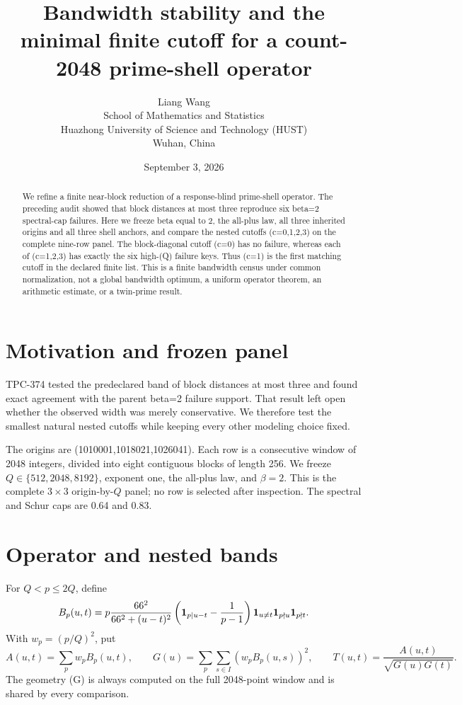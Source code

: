 \documentclass[10pt]{article}
\title{Bandwidth stability and the minimal finite cutoff for a\newline
count-2048 prime-shell operator}
\author{Liang Wang\\
School of Mathematics and Statistics\\
Huazhong University of Science and Technology (HUST)\\
Wuhan, China}
\date{September 3, 2026}
\begin{document}
\maketitle

\begin{abstract}
We refine a finite near-block reduction of a response-blind prime-shell
operator.  The preceding audit showed that block distances at most three
reproduce six beta=2 spectral-cap failures.  Here we freeze beta equal to 2,
the all-plus law, all three inherited origins and all three shell anchors, and
compare the nested cutoffs (c=0,1,2,3) on the complete nine-row panel.  The
block-diagonal cutoff (c=0) has no failure, whereas each of (c=1,2,3)
has exactly the six high-(Q) failure keys.  Thus (c=1) is the first
matching cutoff in the declared finite list.  This is a finite bandwidth
census under common normalization, not a global bandwidth optimum, a
uniform operator theorem, an arithmetic estimate, or a twin-prime result.
\end{abstract}

\section{Motivation and frozen panel}

TPC-374 tested the predeclared band of block distances at most three and
found exact agreement with the parent beta=2 failure support.  That result
left open whether the observed width was merely conservative.  We therefore
test the smallest natural nested cutoffs while keeping every other modeling
choice fixed.

The origins are (1010001,1018021,1026041).  Each row is a consecutive window
of 2048 integers, divided into eight contiguous blocks of length 256.  We
freeze \(Q\in\{512,2048,8192\}\), exponent one, the all-plus law, and
\(\beta=2\).  This is the complete \(3\times3\) origin-by-\(Q\) panel; no row
is selected after inspection.  The spectral and Schur caps are 0.64 and
0.83.

\section{Operator and nested bands}

For \(Q<p\le 2Q\), define
\[
B_p(u,t)=p\frac{66^2}{66^2+(u-t)^2}
\left({\bf1}_{p\mid u-t}-\frac{1}{p-1}\right)
{\bf1}_{u\ne t}{\bf1}_{p\nmid u}{\bf1}_{p\nmid t}.
\]
With \(w_p=(p/Q)^2\), put
\[
A(u,t)=\sum_p w_pB_p(u,t),\qquad
G(u)=\sum_p\sum_{s\in I}(w_pB_p(u,s))^2,
\qquad T(u,t)=\frac{A(u,t)}{\sqrt{G(u)G(t)}}.
\]
The geometry (G) is always computed on the full 2048-point window and is
shared by every comparison.
\end{document}
